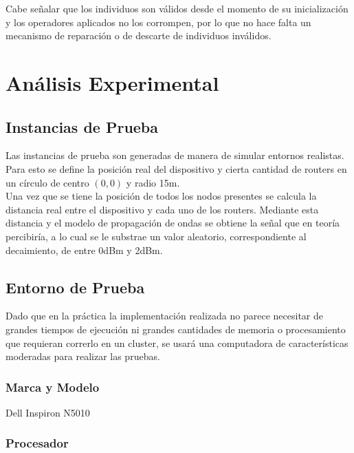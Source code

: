 \documentclass[journal]{IEEEtran}
\begin{document}
Cabe señalar que los individuos son válidos desde el momento de su inicialización y los operadores aplicados no los corrompen, por lo que no hace falta un mecanismo de reparación o de descarte de individuos inválidos.

\section{Análisis Experimental}

\subsection{Instancias de Prueba}

Las instancias de prueba son generadas de manera de simular entornos realistas.\\

Para esto se define la posición real del dispositivo y cierta cantidad de routers en un círculo de centro $(0,0)$ y radio 15m.\\

Una vez que se tiene la posición de todos los nodos presentes se calcula la distancia real entre el dispositivo y cada uno de los routers. Mediante esta distancia y el modelo de propagación de ondas se obtiene la señal que en teoría percibiría, a lo cual se le substrae un valor aleatorio, correspondiente al decaimiento, de entre 0dBm y 2dBm.\\

\subsection{Entorno de Prueba}

Dado que en la práctica la implementación realizada no parece necesitar de grandes tiempos de ejecución ni grandes cantidades de memoria o procesamiento que requieran correrlo en un cluster, se usará una computadora de características moderadas para realizar las pruebas.\\

\subsubsection{Marca y Modelo}

Dell Inspiron N5010\\

\subsubsection{Procesador}
\end{document}
